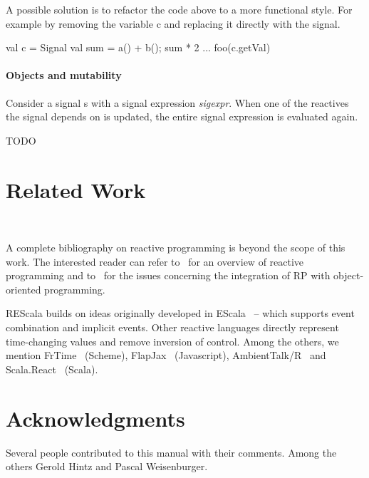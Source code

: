 \documentclass[10pt,a4paper]{article}
\newcommand{\code}[1]{{\fontfamily{cmtt}\small\selectfont#1}}
\begin{document}
A possible solution is to refactor the code above to a more functional
style. For example by removing the variable \code{c} and replacing it
directly with the signal.
\begin{codenv}
val c = Signal{ 
  val sum = a() + b(); 
  sum * 2  
}
 ...
foo(c.getVal)
\end{codenv}






\paragraph{Objects and mutability} Consider a signal \code{s} with a
signal expression {\it sigexpr}. When one of the reactives the signal
depends on is updated, the entire signal expression is evaluated
again.

TODO





\section{Related Work}~\label{sec:related}

A complete bibliography on reactive programming is beyond the scope of
this work. The interested reader can refer
to~\cite{rective-progr-survey} for an overview of reactive programming
and to~\cite{Salvaneschi:2013:RBO:2451436.2451442} for the issues
concerning the integration of RP with object-oriented programming.


REScala builds on ideas originally developed in
EScala~\cite{Gasiunas:2011:EME:1960275.1960303} -- which supports
event combination and implicit events. Other reactive languages
directly represent time-changing values and remove inversion of
control. Among the others, we mention
FrTime~\cite{DBLP:conf/esop/CooperK06} (Scheme),
FlapJax~\cite{Meyerovich:2009:FPL:1640089.1640091} (Javascript),
AmbientTalk/R~\cite{ambienttalkR} and
Scala.React~\cite{EPFL-REPORT-148043} (Scala).


\section{Acknowledgments}

Several people contributed to this manual with their comments. Among
the others Gerold Hintz and Pascal Weisenburger.




\end{document}
